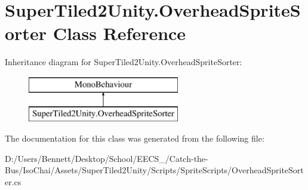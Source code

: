 \hypertarget{class_super_tiled2_unity_1_1_overhead_sprite_sorter}{}\section{Super\+Tiled2\+Unity.\+Overhead\+Sprite\+Sorter Class Reference}
\label{class_super_tiled2_unity_1_1_overhead_sprite_sorter}
Inheritance diagram for Super\+Tiled2\+Unity.\+Overhead\+Sprite\+Sorter\+:\begin{figure}[H]
\begin{center}
\leavevmode
\includegraphics[height=2.000000cm]{class_super_tiled2_unity_1_1_overhead_sprite_sorter}
\end{center}
\end{figure}


The documentation for this class was generated from the following file\+:\begin{DoxyCompactItemize}
\item 
D\+:/\+Users/\+Bennett/\+Desktop/\+School/\+E\+E\+C\+S\+\_/\+Catch-\/the-\/\+Bus/\+Iso\+Chai/\+Assets/\+Super\+Tiled2\+Unity/\+Scripts/\+Sprite\+Scripts/Overhead\+Sprite\+Sorter.\+cs\end{DoxyCompactItemize}
